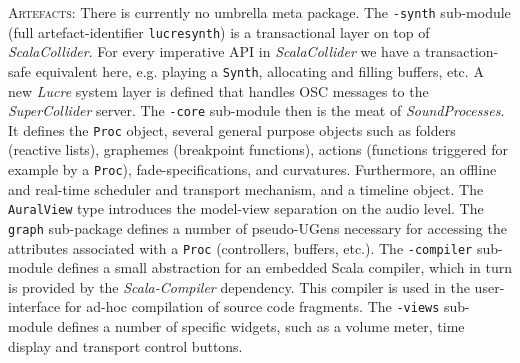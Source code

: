 \documentclass[11pt,a4paper]{article}
\newcommand{\software}[1]{\textit{#1}}
\newcommand{\artefacts}[0]{\textsc{Artefacts:}}
\begin{document}
\artefacts{} There is currently no umbrella meta package. The \verb!-synth! sub-module (full artefact-identifier \verb!lucresynth!) is a transactional layer on top of \software{ScalaCollider}. For every imperative API in \software{ScalaCollider} we have a transaction-safe equivalent here, e.g. playing a \verb!Synth!, allocating and filling buffers, etc. A new \software{Lucre} system layer is defined that handles OSC messages to the \software{SuperCollider} server. The \verb!-core! sub-module then is the meat of \software{SoundProcesses}. It defines the \verb!Proc! object, several general purpose objects such as folders (reactive lists), graphemes (breakpoint functions), actions (functions triggered for example by a \verb!Proc!), fade-specifications, and curvatures. Furthermore, an offline and real-time scheduler and transport mechanism, and a timeline object. The \verb!AuralView! type introduces the model-view separation on the audio level. The \verb!graph! sub-package defines a number of pseudo-UGens necessary for accessing the attributes associated with a \verb!Proc! (controllers, buffers, etc.). The \verb!-compiler! sub-module defines a small abstraction for an embedded Scala compiler, which in turn is provided by the \software{Scala-Compiler} dependency. This compiler is used in the user-interface for ad-hoc compilation of source code fragments. The \verb!-views! sub-module defines a number of specific widgets, such as a volume meter, time display and transport control buttons.
\end{document}
